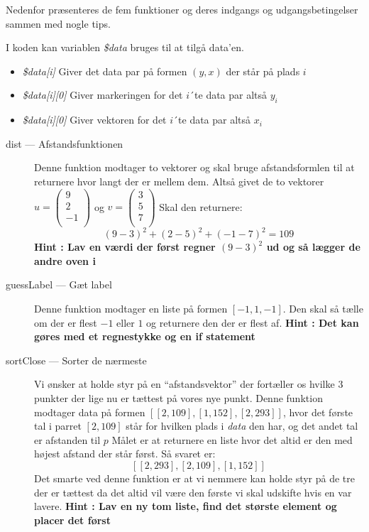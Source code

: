 \documentclass[14pt]{article}
\begin{document}
Nedenfor præsenteres de fem funktioner og deres indgangs og udgangsbetingelser
sammen med nogle tips.

I koden kan variablen \emph{\$data} bruges til at tilgå data'en.
\begin{itemize}
    \item \emph{\$data[i]} Giver det data par på formen $(y,x)$ der står på
    plads $i$
    \item \emph{\$data[i][0]} Giver markeringen for det $i$´te data par altså
    $y_i$
    \item \emph{\$data[i][0]} Giver vektoren for det $i$´te data par altså
    $x_i$
\end{itemize}

    \begin{description}
        \item[dist --- Afstandsfunktionen]
        Denne funktion modtager to vektorer og skal bruge afstandsformlen til at
        returnere hvor langt der er mellem dem.
        Altså givet de to vektorer
        $u = \left(\begin{array}{c} 9\\ 2\\ -1\\\end{array} \right)$
        og
        $v = \left(\begin{array}{c} 3\\ 5\\ 7\\\end{array} \right)$
        Skal den returnere:
        $$
            (9-3)^2 + (2-5)^2 + (-1-7)^2 = 109
        $$
        \textbf{Hint : Lav en værdi der først regner $(9-3)^2$ ud og så lægger de andre oven i}\\

        \item[guessLabel --- Gæt label]
        Denne funktion modtager en liste på formen $[-1, 1, -1]$.
        Den skal så tælle om der er flest $-1$ eller $1$ og returnere den der er
        flest af.
        \textbf{Hint : Det kan gøres med et regnestykke og en if statement}\\

        \newpage

        \item[sortClose --- Sorter de nærmeste]
        Vi ønsker at holde styr på en ``afstandsvektor'' der fortæller os hvilke
        3 punkter der lige nu er tættest på vores nye punkt. Denne funktion
        modtager data på formen $[[2,109], [1,152], [2,293]]$, hvor det første tal
        i parret $[2,109]$ står for hvilken plads i \emph{data} den har, og
        det andet tal er afstanden til $p$
        Målet er at returnere en liste hvor det altid er den med højest afstand
        der står først. Så svaret er:
        $$
            [[2,293], [2,109], [1,152]]
        $$
        Det smarte ved denne funktion er at vi nemmere kan holde styr på de tre
        der er tættest da det altid vil være den første vi skal udskifte hvis en
        var lavere.
        \textbf{Hint : Lav en ny tom liste, find det største element og placer det
        først}\\



\end{description}
\end{document}
